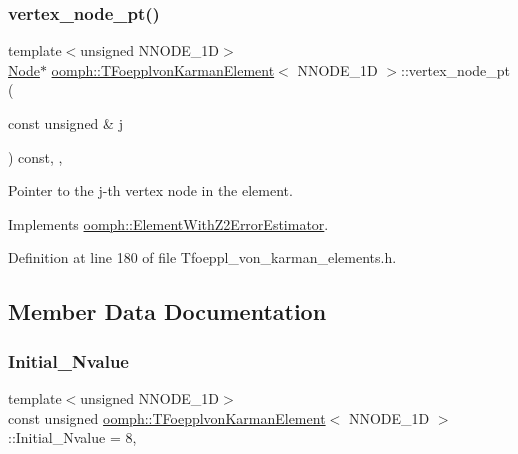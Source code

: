\subsubsection{\texorpdfstring{vertex\+\_\+node\+\_\+pt()}{vertex\_node\_pt()}}
{\footnotesize\ttfamily template$<$unsigned N\+N\+O\+D\+E\+\_\+1D$>$ \\
\hyperlink{classoomph_1_1Node}{Node}$\ast$ \hyperlink{classoomph_1_1TFoepplvonKarmanElement}{oomph\+::\+T\+Foepplvon\+Karman\+Element}$<$ N\+N\+O\+D\+E\+\_\+1D $>$\+::vertex\+\_\+node\+\_\+pt (\begin{DoxyParamCaption}\item[{const unsigned \&}]{j }\end{DoxyParamCaption}) const\hspace{0.3cm}{\ttfamily [inline]}, {\ttfamily [protected]}, {\ttfamily [virtual]}}



Pointer to the j-\/th vertex node in the element. 



Implements \hyperlink{classoomph_1_1ElementWithZ2ErrorEstimator_a0eedccc33519f852c5dc2055ddf2774b}{oomph\+::\+Element\+With\+Z2\+Error\+Estimator}.



Definition at line 180 of file Tfoeppl\+\_\+von\+\_\+karman\+\_\+elements.\+h.



\subsection{Member Data Documentation}
\mbox{\label{classoomph_1_1TFoepplvonKarmanElement_a2871fb75e641c5b5e77d9570b32ff181}} 
\subsubsection{\texorpdfstring{Initial\+\_\+\+Nvalue}{Initial\_Nvalue}}
{\footnotesize\ttfamily template$<$unsigned N\+N\+O\+D\+E\+\_\+1D$>$ \\
const unsigned \hyperlink{classoomph_1_1TFoepplvonKarmanElement}{oomph\+::\+T\+Foepplvon\+Karman\+Element}$<$ N\+N\+O\+D\+E\+\_\+1D $>$\+::Initial\+\_\+\+Nvalue = 8\hspace{0.3cm}{\ttfamily [static]}, {\ttfamily [private]}}



